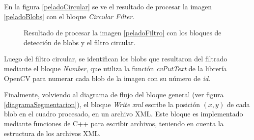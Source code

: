En la figura \ref{peladoCircular} se ve el resultado de procesar la imagen \ref{peladoBlobs} con el bloque \emph{Circular Filter}.

\begin{figure}[H]
        \centering
         
  \caption{Resultado de procesar la imagen \ref{peladoFiltro} con los bloques de detección de blobs y el filtro circular.}
      \label{ejemplocircularfilter}
\end{figure}

Luego del filtro circular, se identifican los blobs que resultaron del filtrado mediante el bloque \emph{Number}, que utiliza la función \emph{cvPutText} de la librería  OpenCV\cite{opencv} para numerar cada blob de la imagen con su número de \textit{id}.

\vspace{10 mm}
Finalmente, volviendo al diagrama de flujo del bloque general (ver figura \ref{diagramaSegmentacion}), el bloque \emph{Write xml} escribe la posición $(x,y)$ de cada blob en el cuadro procesado, en un archivo XML\cite{xml}. Este bloque es implementado mediante funciones de C++ para escribir archivos, teniendo en cuenta la estructura de los archivos XML\cite{xml}.

